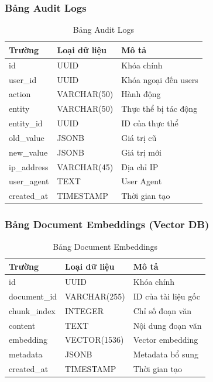 \documentclass[12pt,a4paper]{report}
\begin{document}
\subsubsection{Bảng Audit Logs}

\begin{table}[H]
\centering
\caption{Bảng Audit Logs}
\begin{tabular}{|p{4cm}|p{3.5cm}|p{6cm}|}
\hline
\textbf{Trường} & \textbf{Loại dữ liệu} & \textbf{Mô tả} \\
\hline
id & UUID & Khóa chính \\
\hline
user\_id & UUID & Khóa ngoại đến users \\
\hline
action & VARCHAR(50) & Hành động \\
\hline
entity & VARCHAR(50) & Thực thể bị tác động \\
\hline
entity\_id & UUID & ID của thực thể \\
\hline
old\_value & JSONB & Giá trị cũ \\
\hline
new\_value & JSONB & Giá trị mới \\
\hline
ip\_address & VARCHAR(45) & Địa chỉ IP \\
\hline
user\_agent & TEXT & User Agent \\
\hline
created\_at & TIMESTAMP & Thời gian tạo \\
\hline
\end{tabular}
\label{tab:audit_logs_table}
\end{table}

\subsubsection{Bảng Document Embeddings (Vector DB)}

\begin{table}[H]
\centering
\caption{Bảng Document Embeddings}
\begin{tabular}{|p{4cm}|p{3.5cm}|p{6cm}|}
\hline
\textbf{Trường} & \textbf{Loại dữ liệu} & \textbf{Mô tả} \\
\hline
id & UUID & Khóa chính \\
\hline
document\_id & VARCHAR(255) & ID của tài liệu gốc \\
\hline
chunk\_index & INTEGER & Chỉ số đoạn văn \\
\hline
content & TEXT & Nội dung đoạn văn \\
\hline
embedding & VECTOR(1536) & Vector embedding \\
\hline
metadata & JSONB & Metadata bổ sung \\
\hline
created\_at & TIMESTAMP & Thời gian tạo \\
\hline
\end{tabular}
\label{tab:embeddings_table}
\end{table}
\end{document}
